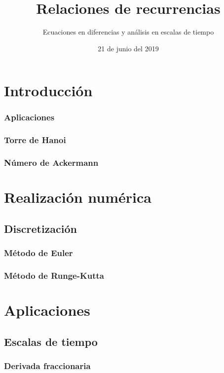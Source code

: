 \documentclass[spanish, utf8,handout]{beamer} %
\title[Teorema de los cuatro colores]{\Huge\sffamily Relaciones de recurrencias}
\subtitle{Ecuaciones en diferencias y análisis en escalas de tiempo}
\author[Grupo N$^\circ6$]{%
	\texorpdfstring{%
		\begin{columns}
			\column{.3\linewidth}
			\centering
			C. Aznarán Laos %
			\column{.3\linewidth}
			\centering
			F. Cruz Ordoñez %
		\end{columns}
		\vspace{12pt}
		\begin{columns}
			\column{.3\linewidth}
			\centering
			G. Quiroz Gómez %
			\column{.3\linewidth}
			\centering
			J. Micha Velasque %
		\end{columns}
		\vspace{12pt}
		\begin{columns}
			\column{.3\linewidth}
			\centering
			D. García Fernández %
			\centering
		\end{columns}
	}
	{Author 1, Author 2, Author 3}
}
\institute[FC -- UNI]{\large%
	Facultad de Ciencias \and%
	Universidad Nacional de Ingeniería
}
\date{21 de junio del 2019}
\theoremstyle{definition}
\begin{document}
\frame{\titlepage}

%
%
\section{Introducción}





\begin{frame}
\frametitle{Aplicaciones}
\end{frame}

\subsubsection{Torre de Hanoi}
\subsubsection{Número de Ackermann}

\section{Realización numérica}

\subsection{Discretización}
\subsubsection{Método de Euler}
\subsubsection{Método de Runge-Kutta}

\section{Aplicaciones}

\subsection{Escalas de tiempo}
\subsubsection{Derivada fraccionaria}
\end{document}
